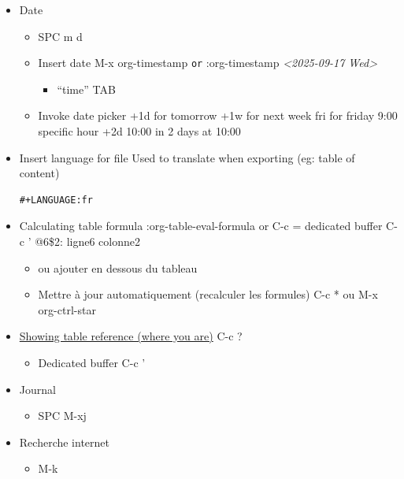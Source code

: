 \documentclass{article}
\begin{document}
\begin{itemize}
\item Date
\label{sec:org9e4df43}
\begin{itemize}
\item SPC m d
\end{itemize}
\begin{itemize}
\item Insert date
\label{sec:org95f8045}
M-x org-timestamp \texttt{or} :org-timestamp
\textit{<2025-09-17 Wed>}
\begin{itemize}
\item ``time'' TAB
\end{itemize}
\item Invoke date picker
\label{sec:orgb6ef62b}
+1d for tomorrow
+1w for next week
fri for friday
9:00 specific hour
+2d 10:00 in 2 days at 10:00
\end{itemize}
\item Insert language for file
\label{sec:org09c2c2b}
Used to translate when exporting (eg: table of content)
\begin{verbatim}
#+LANGUAGE:fr
\end{verbatim}
\item Calculating table formula
\label{sec:org4e846ba}
:org-table-eval-formula or C-c =
dedicated buffer C-c '
@6\$2: ligne6 colonne2
\begin{itemize}
\item ou ajouter en dessous du tableau
\label{sec:orgff1fd86}
\item Mettre à jour automatiquement (recalculer les formules)
\label{sec:org70bbf4f}
C-c * ou M-x org-ctrl-star
\end{itemize}
\item \href{https://orgmode.org/worg/org-tutorials/org-spreadsheet-intro.html}{Showing table reference (where you are)}
\label{sec:org33b53e4}
C-c ?
\begin{itemize}
\item Dedicated buffer
\label{sec:org484e8b9}
C-c '
\end{itemize}
\item Journal
\label{sec:orgefde702}
\begin{itemize}
\item SPC M-xj
\end{itemize}
\item Recherche internet
\label{sec:org6977314}
\begin{itemize}
\item M-k


\end{itemize}
\end{itemize}
\end{document}
